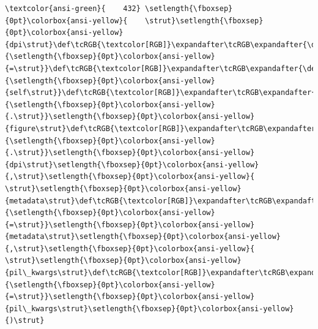 \documentclass[11pt]{article}
\begin{document}
\begin{Verbatim}[commandchars=\\\{\}, frame=single, framerule=2mm, rulecolor=\color{outerrorbackground}]
\textcolor{ansi-green}{    432} \setlength{\fboxsep}{0pt}\colorbox{ansi-yellow}{    \strut}\setlength{\fboxsep}{0pt}\colorbox{ansi-yellow}{dpi\strut}\def\tcRGB{\textcolor[RGB]}\expandafter\tcRGB\expandafter{\detokenize{98,98,98}}{\setlength{\fboxsep}{0pt}\colorbox{ansi-yellow}{=\strut}}\def\tcRGB{\textcolor[RGB]}\expandafter\tcRGB\expandafter{\detokenize{0,135,0}}{\setlength{\fboxsep}{0pt}\colorbox{ansi-yellow}{self\strut}}\def\tcRGB{\textcolor[RGB]}\expandafter\tcRGB\expandafter{\detokenize{98,98,98}}{\setlength{\fboxsep}{0pt}\colorbox{ansi-yellow}{.\strut}}\setlength{\fboxsep}{0pt}\colorbox{ansi-yellow}{figure\strut}\def\tcRGB{\textcolor[RGB]}\expandafter\tcRGB\expandafter{\detokenize{98,98,98}}{\setlength{\fboxsep}{0pt}\colorbox{ansi-yellow}{.\strut}}\setlength{\fboxsep}{0pt}\colorbox{ansi-yellow}{dpi\strut}\setlength{\fboxsep}{0pt}\colorbox{ansi-yellow}{,\strut}\setlength{\fboxsep}{0pt}\colorbox{ansi-yellow}{ \strut}\setlength{\fboxsep}{0pt}\colorbox{ansi-yellow}{metadata\strut}\def\tcRGB{\textcolor[RGB]}\expandafter\tcRGB\expandafter{\detokenize{98,98,98}}{\setlength{\fboxsep}{0pt}\colorbox{ansi-yellow}{=\strut}}\setlength{\fboxsep}{0pt}\colorbox{ansi-yellow}{metadata\strut}\setlength{\fboxsep}{0pt}\colorbox{ansi-yellow}{,\strut}\setlength{\fboxsep}{0pt}\colorbox{ansi-yellow}{ \strut}\setlength{\fboxsep}{0pt}\colorbox{ansi-yellow}{pil\_kwargs\strut}\def\tcRGB{\textcolor[RGB]}\expandafter\tcRGB\expandafter{\detokenize{98,98,98}}{\setlength{\fboxsep}{0pt}\colorbox{ansi-yellow}{=\strut}}\setlength{\fboxsep}{0pt}\colorbox{ansi-yellow}{pil\_kwargs\strut}\setlength{\fboxsep}{0pt}\colorbox{ansi-yellow}{)\strut}


\end{Verbatim}
\end{document}
